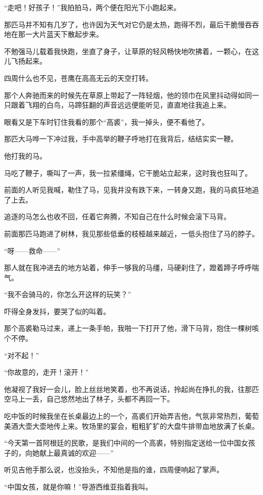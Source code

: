 \par “走吧！好孩子！”我拍拍马，两个便在阳光下小跑起来。
\par 那匹马并不知有几岁了，也许因为天气对它仍是太热，跑得不烈，最后干脆慢吞吞地在那一大片蓝天下散起步来。
\par 不勉强马儿载着我快跑，坐直了身子，让草原的轻风畅快地吹拂着，一颗心，在这儿飞扬起来。
\par 四周什么也不见，苍鹰在高高无云的天空打转。
\par 那个人奔驰而来的时候先在草原上带起了一阵轻烟，他的领巾在风里抖动得如同一只跟着飞翔的白鸟，马蹄狂翻的声音远远便能听见，直直地往我追上来。
\par 眼看又是下车时钉住我看的那个“高裘”，我一掉头，便不看他了。
\par 那匹大马哗一下冲过我，手中高举的鞭子呼地打在我背后，结结实实一鞭。
\par 他打我的马。
\par 马吃了鞭子，嘶叫了一声，我一拉紧缰绳，它干脆站立起来，这时我也狂叫了。
\par 前面的人听见我喊，勒住了马，见我并没有跌下来，一转身又跑，我的马疯狂地追了上去。
\par 追逐的马怎么也收不回，任着它奔腾，不知自己在什么时候会滚下马背。
\par 前面那匹马跑进了树林，我见那些低垂的枝桠越来越近，一低头抱住了马的脖子。
\par “呀——救命——”
\par 那人就在我冲进去的地方站着，伸手一够我的马缰，马硬刹住了，蹬着蹄子呼呼喘气。
\par “我不会骑马的，你怎么开这样的玩笑？”
\par 吓得全身发抖，要哭了似的叫着。
\par 那个高裘勒马过来，递上一条手帕，我啪一下打开了他，滑下马背，抱住一棵树咳个不停。
\par “对不起！”
\par “你故意的，走开！滚开！”
\par 他凝视了我好一会儿，脸上丝丝地笑着，也不再说话，拎起尚在挣扎的我，往那匹空马上一丢，自己悠然地出了林子，头都不再回一下。
\par 吃中饭的时候我坐在长桌最边上的一个，高裘们开始弄吉他，气氛非常热烈，葡萄美酒大壶大壶地传上来。牧场里的宴会，粗粗犷犷的大盘牛排带血地放满了长桌。
\par “今天第一首阿根廷的民歌，是我们中间的一个高裘，特别指定送给一位中国女孩子的，向她献上最真诚的欢迎——”
\par 听见吉他手那么说，也没抬头，不知他是指的谁，四周便响起了掌声。
\par “中国女孩，就是你嘛！”导游西维亚指着我叫。
